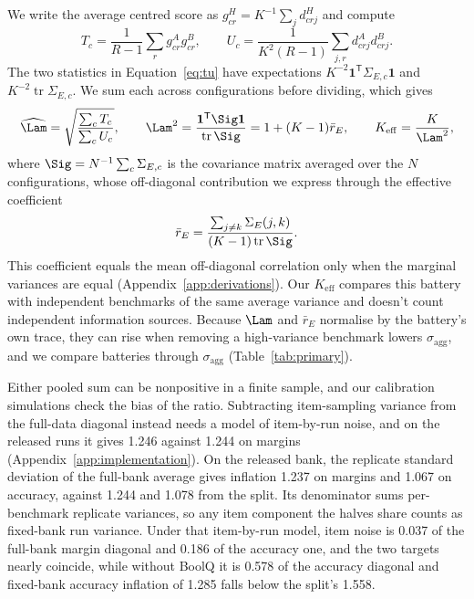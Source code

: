 We write the average centred score as $g^H_{cr}=K^{-1}\sum_j d^H_{crj}$ and compute
\begin{equation}
T_c=\frac{1}{R-1}\sum_r g^A_{cr}g^B_{cr},\qquad
U_c=\frac{1}{K^2(R-1)}\sum_{j,r}d^A_{crj}d^B_{crj}.
\label{eq:tu}
\end{equation}
The two statistics in Equation~\ref{eq:tu} have expectations $K^{-2}\mathbf{1}^{\mathsf T}\Sigma_{E,c}\mathbf{1}$ and $K^{-2}\operatorname{tr}\Sigma_{E,c}$. We sum each across configurations before dividing, which gives
\begin{equation}
\widehat\Lam=\sqrt{\frac{\sum_c T_c}{\sum_c U_c}},\qquad
\Lam^2=\frac{\mathbf{1}^{\mathsf T}\Sig\mathbf{1}}{\operatorname{tr}\Sig}
=1+(K-1)\bar r_E,\qquad K_{\mathrm{eff}}=\frac{K}{\Lam^2},
\label{eq:lambda}
\end{equation}
where $\Sig=N^{-1}\sum_c\Sigma_{E,c}$ is the covariance matrix averaged over the $N$ configurations, whose off-diagonal contribution we express through the effective coefficient
\begin{equation}
\bar r_E=\frac{\sum_{j\ne k}\Sigma_E(j,k)}{(K-1)\operatorname{tr}\Sig}.
\label{eq:effective}
\end{equation}
This coefficient equals the mean off-diagonal correlation only when the marginal variances are equal (Appendix~\ref{app:derivations}). Our $K_{\mathrm{eff}}$ compares this battery with independent benchmarks of the same average variance and doesn't count independent information sources. Because $\Lam$ and $\bar r_E$ normalise by the battery's own trace, they can rise when removing a high-variance benchmark lowers $\sigma_{\mathrm{agg}}$, and we compare batteries through $\sigma_{\mathrm{agg}}$ (Table~\ref{tab:primary}).

Either pooled sum can be nonpositive in a finite sample, and our calibration simulations check the bias of the ratio. Subtracting item-sampling variance from the full-data diagonal instead needs a model of item-by-run noise, and on the released runs it gives 1.246  against 1.244 on margins (Appendix~\ref{app:implementation}). On the released bank, the replicate standard deviation of the full-bank average gives inflation 1.237  on margins and 1.067  on accuracy, against 1.244 and 1.078 from the split. Its denominator sums per-benchmark replicate variances, so any item component the halves share counts as fixed-bank run variance. Under that item-by-run model, item noise is 0.037 of the full-bank margin diagonal and 0.186 of the accuracy one, and the two targets nearly coincide, while without BoolQ it is 0.578 of the accuracy diagonal and fixed-bank accuracy inflation of 1.285 falls below the split's 1.558.

